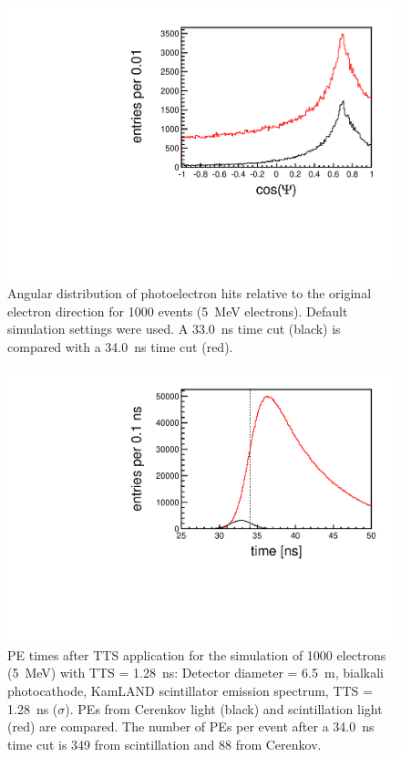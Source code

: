 \documentclass[aps,prc,twocolumn,groupedaddress,showpacs,amsmath,amssymb,floatfix,superscriptaddress]{revtex4}
\begin{document}
\begin{figure}
        \begin{center}
        \includegraphics[scale=0.40]{graphs/cos_psi_comp_h.pdf}
        \caption[]{Angular distribution of photoelectron hits relative to the original electron direction for 1000 events (5~MeV electrons). Default simulation settings were used. A 33.0~ns time cut (black) is compared with a 34.0~ns time cut (red). \label{cerenkov_cone}}
        \end{center}
\end{figure}
\begin{figure}
        \begin{center}
        \includegraphics[scale=0.40]{graphs/6p5Meter_5MeVElectrons_Bialkali_KamlandScintSpec_1p28nsTTS_TIME.pdf}
        \caption[]{PE times after TTS application for the simulation of 1000 electrons (5~MeV) with TTS = 1.28~ns: Detector diameter = 6.5~m, bialkali photocathode, KamLAND scintillator emission spectrum, TTS = 1.28~ns ($\sigma$). PEs from Cerenkov light (black) and scintillation light (red) are compared. The number of PEs per event after a 34.0~ns time cut is 349 from scintillation and 88 from Cerenkov. \label{6p5Meter_5MeVElectrons_Bialkali_KamlandScintSpec_1p28nsTTS_TIME}}
        \end{center}
\end{figure}
\end{document}
